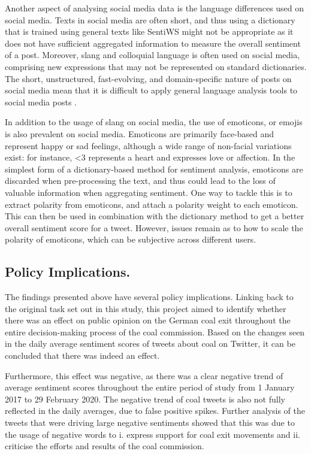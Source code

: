 \documentclass[12pt,onecolumn,twoside]{layout}
\begin{document}
Another aspect of analysing social media data is the language differences used on social media. Texts in social media are often short, and thus using a dictionary that is trained using general texts like SentiWS might not be appropriate as it does not have sufficient aggregated information to measure the overall sentiment of a post. Moreover, slang and colloquial language is often used on social media, comprising new expressions that may not be represented on standard dictionaries. The short, unstructured, fast-evolving, and domain-specific nature of posts on social media mean that it is difficult to apply general language analysis tools to social media posts \citep{Hu2013}.

In addition to the usage of slang on social media, the use of emoticons, or emojis is also prevalent on social media. Emoticons are primarily face-based and represent happy or sad feelings, although a wide range of non-facial variations exist: for instance, <3 represents a heart and expresses love or affection. In the simplest form of a dictionary-based method for sentiment analysis, emoticons are discarded when pre-processing the text, and thus could lead to the loss of valuable information when aggregating sentiment. One way to tackle this is to extract polarity from emoticons, and attach a polarity weight to each emoticon. This can then be used in combination with the dictionary method to get a better overall sentiment score for a tweet. However, issues remain as to how to scale the polarity of emoticons, which can be subjective across different users.

\subsection*{Policy Implications.}
The findings presented above have several policy implications. Linking back to the original task set out in this study, this project aimed to identify whether there was an effect on public opinion on the German coal exit throughout the entire decision-making process of the coal commission. Based on the changes seen in the daily average sentiment scores of tweets about coal on Twitter, it can be concluded that there was indeed an effect.

Furthermore, this effect was negative, as there was a clear negative trend of average sentiment scores throughout the entire period of study from 1 January 2017 to 29 February 2020. The negative trend of coal tweets is also not fully reflected in the daily averages, due to false positive spikes. Further analysis of the tweets that were driving large negative sentiments showed that this was due to the usage of negative words to i. express support for coal exit movements and ii. criticise the efforts and results of the coal commission.
\end{document}
